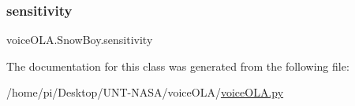 \mbox{\label{classvoiceOLA_1_1SnowBoy_af19c996792bb8af65dc007390d59c459}} 
\subsubsection{\texorpdfstring{sensitivity}{sensitivity}}
{\footnotesize\ttfamily voice\+O\+L\+A.\+Snow\+Boy.\+sensitivity}



The documentation for this class was generated from the following file\+:\begin{DoxyCompactItemize}
\item 
/home/pi/\+Desktop/\+U\+N\+T-\/\+N\+A\+S\+A/voice\+O\+L\+A/\hyperlink{voiceOLA_8py}{voice\+O\+L\+A.\+py}\end{DoxyCompactItemize}
